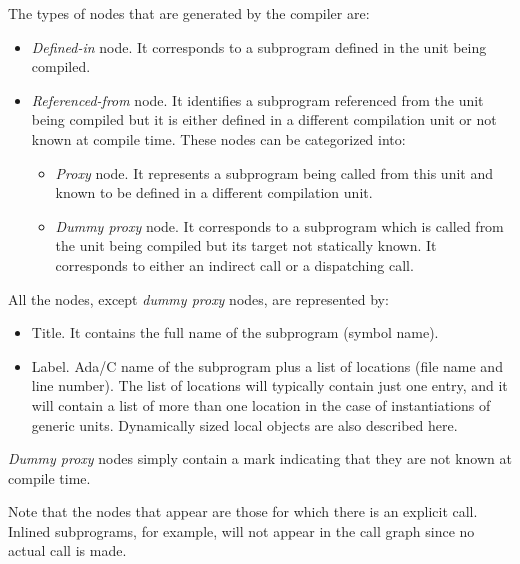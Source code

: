The types of nodes that are generated by the compiler are:

\begin{itemize}

\item \emph{Defined-in} node. It corresponds to a subprogram defined
  in the unit being compiled.

\item \emph{Referenced-from} node. It identifies a subprogram
  referenced from the unit being compiled but it is either defined in a
  different compilation unit or not known at compile time. These nodes
  can be categorized into:

  \begin{itemize}
  
  \item \emph{Proxy} node. It represents a subprogram being called
  from this unit and known to be defined in a different compilation
  unit.

  \item \emph{Dummy proxy} node. It corresponds to a subprogram which
  is called from the unit being compiled but its target not statically
  known. It corresponds to either an indirect call or a dispatching
  call.

  \end{itemize}

\end{itemize}

All the nodes, except \emph{dummy proxy} nodes, are represented by:

\begin{itemize}

\item Title. It contains the full name of the subprogram (symbol
  name).

\item Label. Ada/C name of the subprogram plus a list of locations (file
 name and line number). The list of locations will typically contain
 just one entry, and it will contain a list of more than one location
 in the case of instantiations of generic units. Dynamically sized
 local objects are also described here.

\end{itemize}

\emph{Dummy proxy} nodes simply contain a mark indicating that they
are not known at compile time.

Note that the nodes that appear are those for which there is an
explicit call. Inlined subprograms, for example, will not appear in
the call graph since no actual call is made.

